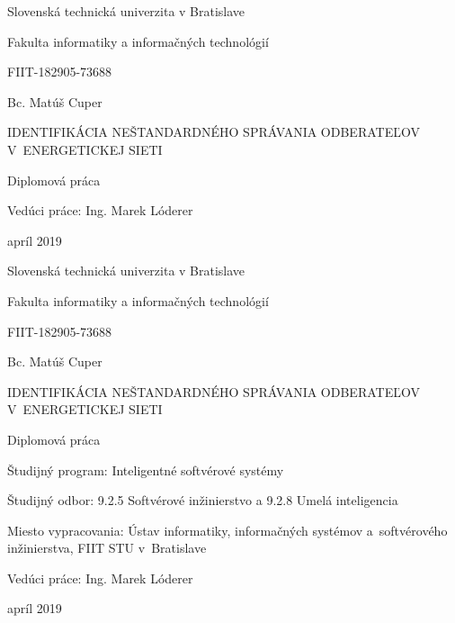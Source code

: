 \documentclass[a4paper,twoside,slovak,12pt,appendix]{article}
\begin{document}
\begin{titlepage}
	\centering
	{\Large Slovenská technická univerzita v Bratislave \par}
	{\Large Fakulta informatiky a informačných technológií \par}
  \vspace{0.5cm}
  {\Large FIIT-182905-73688 \par}
	\vspace{7cm}
  {\large Bc. Matúš Cuper \par}
  \vspace{0.5cm}
	{\LARGE IDENTIFIKÁCIA NEŠTANDARDNÉHO SPRÁVANIA ODBERATEĽOV V~ENERGETICKEJ SIETI \par}
	\vspace{0.5cm}
	{\large Diplomová práca \par}
	\vspace{7cm}
  \flushleft
	{\large Vedúci práce: Ing. Marek Lóderer \par}
  \vspace{0.5cm}
  {\large apríl 2019 \par}
	\vfill
\end{titlepage}
\newpage\null\thispagestyle{empty}\newpage

\begin{titlepage}
	\centering
  {\Large Slovenská technická univerzita v Bratislave \par}
	{\Large Fakulta informatiky a informačných technológií \par}
  \vspace{0.5cm}
  {\Large FIIT-182905-73688 \par}
	\vspace{7cm}
  {\large Bc. Matúš Cuper \par}
  \vspace{0.5cm}
  {\LARGE IDENTIFIKÁCIA NEŠTANDARDNÉHO SPRÁVANIA ODBERATEĽOV V~ENERGETICKEJ SIETI \par}
	\vspace{0.5cm}
	{\large Diplomová práca \\}
	\vspace{6cm}
  \flushleft
  {\normalsize Študijný program: \hphantom{aaa} Inteligentné softvérové systémy \par}
	{\normalsize Študijný odbor: \hphantom{aaaaa} 9.2.5 Softvérové inžinierstvo a 9.2.8 Umelá inteligencia \par}
	{\normalsize Miesto vypracovania: \hphantom{} Ústav informatiky, informačných systémov a~softvérového \hphantom{Miesto vypracovania:.} inžinierstva, FIIT STU v~Bratislave \par}
	{\normalsize Vedúci práce: \hphantom{aaaaaaa} Ing. Marek Lóderer \par}
  \vspace{0.5cm}
  {\normalsize apríl 2019 \par}
\end{titlepage}
\newpage\null\thispagestyle{empty}\newpage
\end{document}
